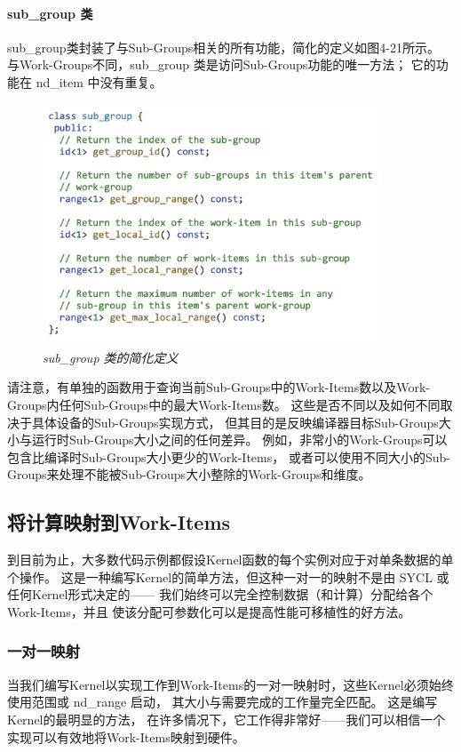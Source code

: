 \paragraph{sub\_group 类}

sub\_group类封装了与Sub-Groups相关的所有功能，简化的定义如图4-21所示。 
与Work-Groups不同，sub\_group 类是访问Sub-Groups功能的唯一方法； 它的功能在 nd\_item 中没有重复。

\begin{figure}[H]
	\centering
	\includegraphics[width=0.9\textwidth]{figs/F4.21.png}
	\caption{\textit{sub\_group 类的简化定义}}
\end{figure}

请注意，有单独的函数用于查询当前Sub-Groups中的Work-Items数以及Work-Groups内任何Sub-Groups中的最大Work-Items数。 
这些是否不同以及如何不同取决于具体设备的Sub-Groups实现方式，
但其目的是反映编译器目标Sub-Groups大小与运行时Sub-Groups大小之间的任何差异。 
例如，非常小的Work-Groups可以包含比编译时Sub-Groups大小更少的Work-Items，
或者可以使用不同大小的Sub-Groups来处理不能被Sub-Groups大小整除的Work-Groups和维度。

\subsection{将计算映射到Work-Items}
到目前为止，大多数代码示例都假设Kernel函数的每个实例对应于对单条数据的单个操作。 
这是一种编写Kernel的简单方法，但这种一对一的映射不是由 SYCL 或任何Kernel形式决定的——
我们始终可以完全控制数据（和计算）分配给各个Work-Items，并且 使该分配可参数化可以是提高性能可移植性的好方法。

\subsubsection{一对一映射}
当我们编写Kernel以实现工作到Work-Items的一对一映射时，这些Kernel必须始终使用范围或 nd\_range 启动，
其大小与需要完成的工作量完全匹配。 这是编写Kernel的最明显的方法，
在许多情况下，它工作得非常好——我们可以相信一个实现可以有效地将Work-Items映射到硬件。

